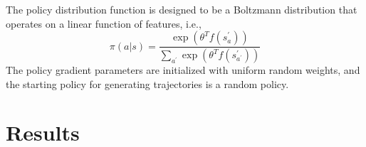 \documentclass[11pt]{article}
\begin{document}
The policy distribution function is designed to be a Boltzmann distribution that operates on a linear function of features, i.e.,
\[ \pi(a|s)=\frac{\exp\left(\theta^{T}f\left(s_{a}^{\prime}\right)\right)}{\underset{a^{\prime}}{\sum}\exp\left(\theta^{T}f\left(s_{a^{\prime}}^{\prime}\right)\right)} \]
 The policy gradient parameters are initialized with uniform random weights, and the starting policy for generating trajectories is a random policy.

\section{Results}
\end{document}
